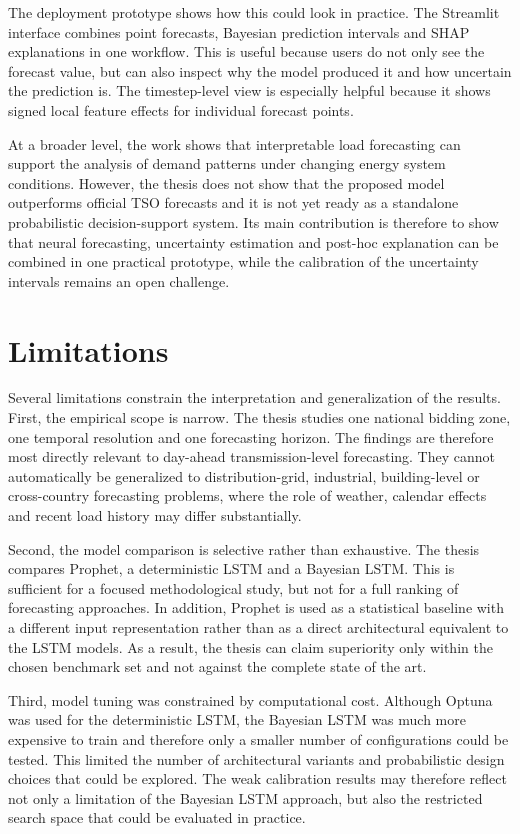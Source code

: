 \documentclass[Master,english,IEEE]{twbook}
\begin{document}
The deployment prototype shows how this could look in practice. The Streamlit interface combines point forecasts, Bayesian prediction intervals and SHAP explanations in one workflow. This is useful because users do not only see the forecast value, but can also inspect why the model produced it and how uncertain the prediction is. The timestep-level view is especially helpful because it shows signed local feature effects for individual forecast points.

At a broader level, the work shows that interpretable load forecasting can support the analysis of demand patterns under changing energy system conditions. However, the thesis does not show that the proposed model outperforms official TSO forecasts and it is not yet ready as a standalone probabilistic decision-support system. Its main contribution is therefore to show that neural forecasting, uncertainty estimation and post-hoc explanation can be combined in one practical prototype, while the calibration of the uncertainty intervals remains an open challenge.

\section{Limitations}

Several limitations constrain the interpretation and generalization of the results. First, the empirical scope is narrow. The thesis studies one national bidding zone, one temporal resolution and one forecasting horizon. The findings are therefore most directly relevant to day-ahead transmission-level forecasting. They cannot automatically be generalized to distribution-grid, industrial, building-level or cross-country forecasting problems, where the role of weather, calendar effects and recent load history may differ substantially.

Second, the model comparison is selective rather than exhaustive. The thesis compares Prophet, a deterministic LSTM and a Bayesian LSTM. This is sufficient for a focused methodological study, but not for a full ranking of forecasting approaches. In addition, Prophet is used as a statistical baseline with a different input representation rather than as a direct architectural equivalent to the LSTM models. As a result, the thesis can claim superiority only within the chosen benchmark set and not against the complete state of the art.

Third, model tuning was constrained by computational cost. Although Optuna was used for the deterministic LSTM, the Bayesian LSTM was much more expensive to train and therefore only a smaller number of configurations could be tested. This limited the number of architectural variants and probabilistic design choices that could be explored. The weak calibration results may therefore reflect not only a limitation of the Bayesian LSTM approach, but also the restricted search space that could be evaluated in practice.
\end{document}

